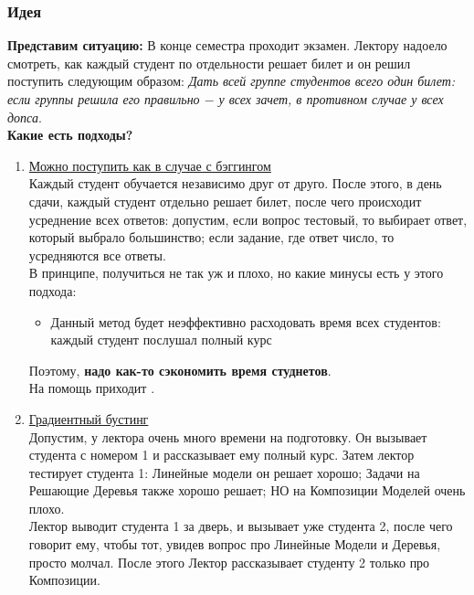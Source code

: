         \subsubsection{Идея}
            \textbf{Представим ситуацию:} В конце семестра проходит экзамен. Лектору надоело смотреть, как каждый студент по отдельности решает билет и он решил поступить следующим образом: \textit{Дать всей группе студентов всего один билет: если группы решила его правильно $-$ у всех зачет, в противном случае у всех допса}.\\

            \textbf{Какие есть подходы?}
            \begin{enumerate}
                \item \underline{Можно поступить как в случае с бэггингом}\\

                Каждый студент обучается независимо друг от друго. После этого, в день сдачи, каждый студент отдельно решает билет, после чего происходит усреднение всех ответов: допустим, если вопрос тестовый, то выбирает ответ, который выбрало большинство; если задание, где ответ число, то усредняются все ответы.\\

                В принципе, получиться не так уж и плохо, но какие минусы есть у этого подхода:
                \begin{itemize}
                    \item Данный метод будет неэффективно расходовать время всех студентов: каждый студент послушал полный курс
                \end{itemize}
                Поэтому, \textbf{надо как-то сэкономить время студнетов}.\\

                На помощь приходит .

            \item \underline{Градиентный бустинг}\\

            Допустим, у лектора очень много времени на подготовку. Он вызывает студента с номером 1 и рассказывает ему полный курс. Затем лектор тестирует студента 1: Линейные модели он решает хорошо; Задачи на Решающие Деревья также хорошо решает; НО на Композиции Моделей очень плохо.\\
            
            Лектор выводит студента 1 за дверь, и вызывает уже студента 2, после чего говорит ему, чтобы тот, увидев вопрос про Линейные Модели и Деревья, просто молчал. После этого Лектор рассказывает студенту 2 только про Композиции.\\


\end{enumerate}
